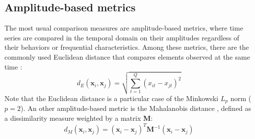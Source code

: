\subsection{Amplitude-based metrics}
\label{sec:TSmetrics}

The most usual comparison measures are amplitude-based metrics, where time series are compared in the temporal domain on their amplitudes regardless of their behaviors or frequential characteristics. Among these metrics, there are the commonly used Euclidean distance that compares elements observed at the same time \cite{Ding2008}: 
\begin{equation}	
	d_E(\textbf{x}_i,\textbf{x}_j) = \sqrt{\sum\limits_{t=1}^{Q} (x_{it}-x_{jt})^2}
\label{eq:A}
\end{equation}
Note that the Euclidean distance is a particular case of the Minkowski $L_p$ norm ($p=2$). An other amplitude-based metric is the Mahalanobis distance \cite{Prekopcsak2012}, defined as a dissimilarity measure weighted by a matrix \textbf{M}:
\begin{equation}	
	d_M(\textbf{x}_i,\textbf{x}_j) = (\textbf{x}_i-\textbf{x}_j)^T\textbf{M}^{-1}(\textbf{x}_i-\textbf{x}_j)
	\label{eq:dM}
\end{equation}

